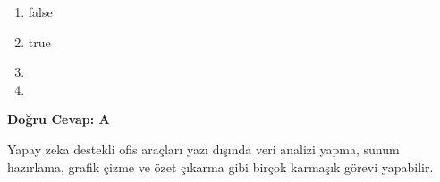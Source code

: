 \documentclass[11pt,a4paper,openany]{book}
\begin{document}
\begin{enumerate}[label=\Alph*), leftmargin=25pt, topsep=4pt, itemsep=2pt]
        \item false
        \item true
        \item 
        \item 
\end{enumerate}

\vspace{4pt}
\begin{tcolorbox}[title=Cevap ve Açıklama, colback=gray!3!white, colframe=primarycolor!90!black, arc=2mm, fonttitle=\bfseries\sffamily, top=6pt, bottom=6pt]
    \textbf{Doğru Cevap: A}

    \vspace{2pt}
    Yapay zeka destekli ofis araçları yazı dışında veri analizi yapma, sunum hazırlama, grafik çizme ve özet çıkarma gibi birçok karmaşık görevi yapabilir.
\end{tcolorbox}
\vspace{10pt}
\end{document}
